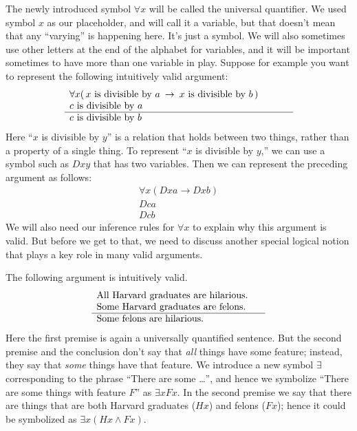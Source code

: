 The newly introduced symbol $\forall x$ will be called the
\gls{universal quantifier}.  We used symbol $x$ as our placeholder,
and will call it a \gls{variable}, but that doesn't mean that any
``varying'' is happening here.  It's just a symbol.  We will also
sometimes use other letters at the end of the alphabet for variables,
and it will be important sometimes to have more than one variable in
play.  Suppose for example you want to represent the following
intuitively valid argument:
\[ \begin{array}{p{8cm}} 
  $\forall x$($\,x$ is divisible by $a$ $\,\to\,$ $x$ is divisible by $b\,$) \\
     $c$ is divisible by $a$ \\ \hline
     $c$ is divisible by $b$
   \end{array} \]
Here ``$x$ is divisible by $y$'' is a relation that holds between two
things, rather than a property of a single thing.  To represent ``$x$
is divisible by $y$,'' we can use a symbol such as $Dxy$ that has two
variables.  Then we can represent the preceding argument as follows:
\[ \begin{array}{l}
     \forall x(Dxa\to Dxb) \\
     Dca \\ \hline Dcb \end{array} \] We will also need our inference
 rules for $\forall x$ to explain why this argument is valid.  But before we get to that, we need to discuss another special logical notion that plays a key role in many valid arguments.

The following argument is intuitively valid.
\[ \begin{array}{p{6cm}}
     All Harvard graduates are hilarious.  \\
     Some Harvard graduates are felons.  \\ \hline
     Some felons are hilarious.  \end{array} \]
Here the first premise is again a universally quantified
  sentence.  But the second premise and the conclusion don't say that
{\it all} things have some feature; instead, they say that {\it some}
things have that feature.  We introduce a new symbol $\exists$
corresponding to the phrase ``There are some \dots '', and hence we
symbolize ``There are some things with feature $F$'' as $\exists
xFx$.  In the second premise we say that there are things that are
both Harvard graduates ($Hx$) and felons ($Fx$); hence it could be
symbolized as $\exists x(Hx\wedge Fx)$.  

